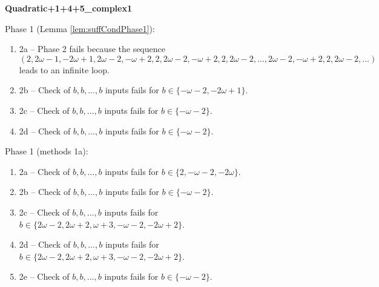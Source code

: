 \begin{exmp}
\label{ex:compareAP}

\textbf{Quadratic+1+4+5\_complex1}

Phase 1 (Lemma \ref{lem:suffCondPhase1}):
\begin{enumerate}[ ]
\item  2a -- Phase 2   fails because  the sequence $(2,\allowbreak  2\omega - 1,\allowbreak  -2\omega + 1,\allowbreak  2\omega - 2,\allowbreak  -\omega + 2,\allowbreak  2,\allowbreak  2\omega - 2,\allowbreak  -\omega + 2,\allowbreak  2,\allowbreak  2\omega - 2,\allowbreak  \dots ,\allowbreak 2\omega - 2,\allowbreak  -\omega + 2,\allowbreak  2,\allowbreak  2\omega - 2,\allowbreak  \dots)$ leads to an infinite loop.
\item  2b -- Check of $b,\allowbreak b,\allowbreak \dots,\allowbreak b$ inputs fails for $b\in \{-\omega - 2,\allowbreak  -2\omega + 1\}$.
\item  2c -- Check of $b,\allowbreak b,\allowbreak \dots,\allowbreak b$ inputs fails for $b\in \{-\omega - 2\}$.
\item  2d -- Check of $b,\allowbreak b,\allowbreak \dots,\allowbreak b$ inputs fails for $b\in \{-\omega - 2\}$.
\end{enumerate}


Phase 1 (methods 1a):
\begin{enumerate}[ ]
\item  2a -- Check of $b,\allowbreak b,\allowbreak \dots,\allowbreak b$ inputs fails for $b\in \{2,\allowbreak  -\omega - 2,\allowbreak  -2\omega\}$.
\item  2b -- Check of $b,\allowbreak b,\allowbreak \dots,\allowbreak b$ inputs fails for $b\in \{-\omega - 2\}$.
\item  2c -- Check of $b,\allowbreak b,\allowbreak \dots,\allowbreak b$ inputs fails for $b\in \{2\omega - 2,\allowbreak  2\omega + 2,\allowbreak  \omega + 3,\allowbreak  -\omega - 2,\allowbreak  -2\omega + 2\}$.
\item  2d -- Check of $b,\allowbreak b,\allowbreak \dots,\allowbreak b$ inputs fails for $b\in \{2\omega - 2,\allowbreak  2\omega + 2,\allowbreak  \omega + 3,\allowbreak  -\omega - 2,\allowbreak  -2\omega + 2\}$.
\item  2e -- Check of $b,\allowbreak b,\allowbreak \dots,\allowbreak b$ inputs fails for $b\in \{-\omega - 2\}$.
\end{enumerate}



\end{exmp}
